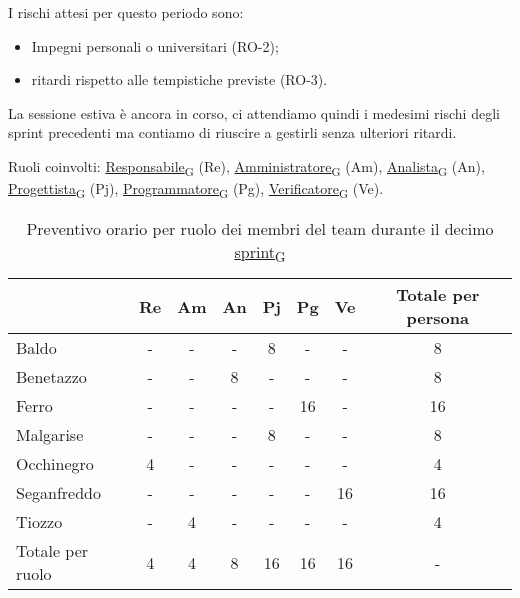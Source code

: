 I rischi attesi per questo periodo sono:
\begin{itemize}
    \item Impegni personali o universitari (RO-2);
	\item ritardi rispetto alle tempistiche previste (RO-3).
\end{itemize}
La sessione estiva è ancora in corso, ci attendiamo quindi i medesimi rischi degli sprint precedenti ma contiamo di riuscire a gestirli senza ulteriori ritardi.

\newpage
{}
Ruoli coinvolti: \href{https://7last.github.io/docs/pb/documentazione-interna/glossario\#responsabile}{Responsabile\textsubscript{G}} (Re), \href{https://7last.github.io/docs/pb/documentazione-interna/glossario\#amministratore}{Amministratore\textsubscript{G}} (Am), \href{https://7last.github.io/docs/pb/documentazione-interna/glossario\#analista}{Analista\textsubscript{G}} (An), \href{https://7last.github.io/docs/pb/documentazione-interna/glossario\#progettista}{Progettista\textsubscript{G}} (Pj), \href{https://7last.github.io/docs/pb/documentazione-interna/glossario\#programmatore}{Programmatore\textsubscript{G}} (Pg), \href{https://7last.github.io/docs/pb/documentazione-interna/glossario\#verificatore}{Verificatore\textsubscript{G}} (Ve).
\begin{table}[!h]
    \centering
    \begin{tabular}{ | l | c | c | c | c | c | c | c | }
        \hline
        \textbf{} & \textbf{Re} & \textbf{Am} &\textbf{An} & \textbf{Pj} & \textbf{Pg} & \textbf{Ve} & \textbf{Totale per persona} \\
        \hline
        Baldo            &  -   &  -   &  -   &  8   &  -   &  -   &  8   \\
        Benetazzo        &  -   &  -   &  8   &  -   &  -   &  -   &  8   \\
        Ferro            &  -   &  -   &  -   &  -   & 16   &  -   & 16   \\
        Malgarise        &  -   &  -   &  -   &  8   &  -   &  -   &  8   \\
        Occhinegro       &  4   &  -   &  -   &  -   &  -   &  -   &  4   \\
        Seganfreddo      &  -   &  -   &  -   &  -   &  -   & 16   & 16   \\
        Tiozzo           &  -   &  4   &  -   &  -   &  -   &  -   &  4   \\
        \hline
        Totale per ruolo &  4   &  4   &  8   & 16   & 16   & 16   &  -   \\
        \hline
    \end{tabular}
    \caption{Preventivo orario per ruolo dei membri del team durante il decimo \href{https://7last.github.io/docs/pb/documentazione-interna/glossario\#sprint}{sprint\textsubscript{G}}}
    
\end{table}

